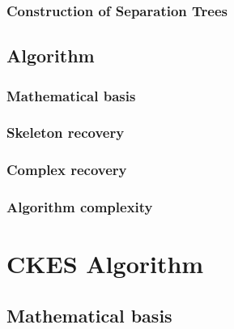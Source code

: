\documentclass{pracamgr}
\theoremstyle{definition}
\begin{document}
		\subsection{Construction of Separation Trees} \label{subsec:SepTreesConstruct}
						
			
		
		
	\section{Algorithm}
		
			
		\subsection{Mathematical basis} \label{subsec:LCDMathBasis}
				
	
		\subsection{Skeleton recovery} \label{subsec:LCDSkeletonRecovery}
				
	
		\subsection{Complex recovery} \label{subsec:LCDComplexRecovery}
			
	
		\subsection{Algorithm complexity} \label{subsec:LCDAlgComplex}
			
			
			
\chapter{CKES Algorithm}
	
	

	\section{Mathematical basis} \label{sec:CKESMathBasis}
		
\end{document}
